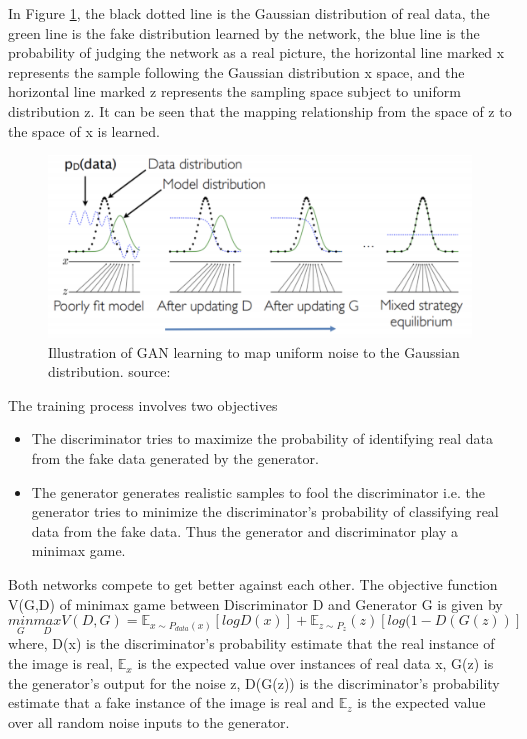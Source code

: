 In Figure \ref{fig:gandist}, the black dotted line is the Gaussian distribution of real data, the green line is the fake distribution learned by the network, the blue line is the probability of judging the network as a real picture, the horizontal line marked x represents the sample following the Gaussian distribution x space, and the horizontal line marked z represents the sampling space subject to uniform distribution z. It can be seen that the mapping relationship from the space of z to the space of x is learned.
\begin{figure}[H]
\centering
\includegraphics[width=5in,scale=1]{images/GANdist.png}
\caption[Illustration of GAN learning to map uniform noise to the Gaussian distribution]{Illustration of GAN learning to map uniform noise to the Gaussian distribution. source: \citep{gandist}}
\label{fig:gandist}
\end{figure}

The training process involves two objectives
\begin{itemize}
\item The discriminator tries to maximize the probability of identifying real data from the fake data generated by the generator.
\item The generator generates realistic samples to fool the discriminator i.e. the generator tries to minimize the discriminator's probability of classifying real data from the fake data.
Thus the generator and discriminator play a minimax game.
\end{itemize}
 Both networks compete to get better against each other. The objective function V(G,D) of minimax game \citep{goodfellow2014generative} between Discriminator D and Generator G is given by
\begin{equation*}
\underset{G}{min}\underset{D}{max}V(D,G)=\mathbb{E}_{x\sim P_{data}(x)}[log D(x)] + \mathbb{E}_{z\sim P_{z}}(z)[log(1-D(G(z))]
\end{equation*}
where, D(x) is the discriminator's probability estimate that the real instance of the image is real, $\mathbb{E}_x$ is the expected value over instances of real data x, G(z) is the generator's output for the noise z, D(G(z)) is the discriminator's probability estimate that a fake instance of the image is real and $\mathbb{E}_z$ is the expected value over all random noise inputs to the generator.

